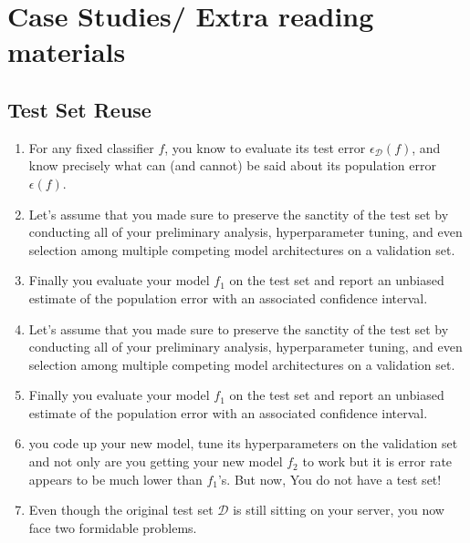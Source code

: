 \chapter{Case Studies/ Extra reading materials}

\section{Test Set Reuse \cite{dnn-1}} \label{story: Test Set Reuse}

\begin{fontSizeEnv}{8pt}

\begin{enumerate}
    \item For any fixed classifier $f$, you know to evaluate its test error $\epsilon_\mathcal{D}(f)$, and know precisely what can (and cannot) be said about its population error $\epsilon(f)$.

    \item Let’s assume that you made sure to preserve the sanctity of the test set by conducting all of your preliminary analysis, hyperparameter tuning, and even selection among multiple competing model architectures on a validation set. 

    \item Finally you evaluate your model $f_1$ on the test set and report an unbiased estimate of the population error with an associated confidence interval.

    \item Let’s assume that you made sure to preserve the sanctity of the test set by conducting all of your preliminary analysis, hyperparameter tuning, and even selection among multiple competing model architectures on a validation set. 
    
    \item Finally you evaluate your model $f_1$ on the test set and report an unbiased estimate of the population error with an associated confidence interval.

    \item you code up your new model, tune its hyperparameters on the validation set and not only are you getting your new model $f_2$ to work but it is error rate appears to be much lower than $f_1$’s. But now, You do not have a test set!

    \item Even though the original test set $\mathcal{D}$ is still sitting on your server, you now face two formidable problems. 
    

\end{enumerate}
\end{fontSizeEnv}

